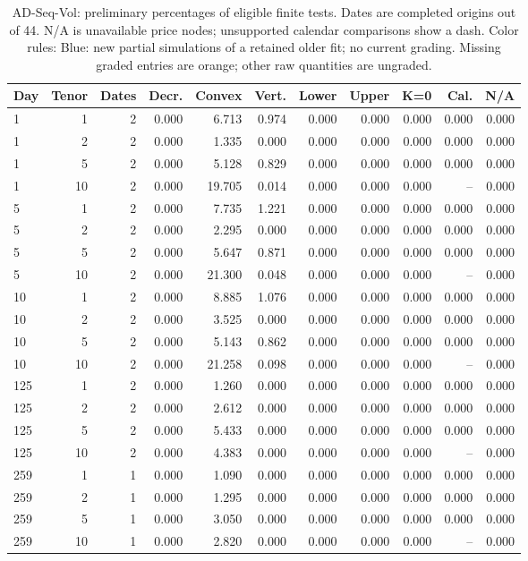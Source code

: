 \documentclass[11pt]{article}
\begin{document}
\begin{table}[H]\centering\small\setlength{\tabcolsep}{4pt}
\caption{AD-Seq-Vol: preliminary percentages of eligible finite tests. Dates are completed origins out of 44. N/A is unavailable price nodes; unsupported calendar comparisons show a dash. Color rules: Blue: new partial simulations of a retained older fit; no current grading. Missing graded entries are orange; other raw quantities are ungraded.}\label{tab:diffusion-static-base}
\begin{tabular}{@{}lrrrrrrrrrr@{}}
\toprule
Day & Tenor & Dates & Decr. & Convex & Vert. & Lower & Upper & K=0 & Cal. & N/A \\
\midrule
1 & 1 & 2 & 0.000 & 6.713 & 0.974 & 0.000 & 0.000 & 0.000 & 0.000 & 0.000 \\
1 & 2 & 2 & 0.000 & 1.335 & 0.000 & 0.000 & 0.000 & 0.000 & 0.000 & 0.000 \\
1 & 5 & 2 & 0.000 & 5.128 & 0.829 & 0.000 & 0.000 & 0.000 & 0.000 & 0.000 \\
1 & 10 & 2 & 0.000 & 19.705 & 0.014 & 0.000 & 0.000 & 0.000 & -- & 0.000 \\
5 & 1 & 2 & 0.000 & 7.735 & 1.221 & 0.000 & 0.000 & 0.000 & 0.000 & 0.000 \\
5 & 2 & 2 & 0.000 & 2.295 & 0.000 & 0.000 & 0.000 & 0.000 & 0.000 & 0.000 \\
5 & 5 & 2 & 0.000 & 5.647 & 0.871 & 0.000 & 0.000 & 0.000 & 0.000 & 0.000 \\
5 & 10 & 2 & 0.000 & 21.300 & 0.048 & 0.000 & 0.000 & 0.000 & -- & 0.000 \\
10 & 1 & 2 & 0.000 & 8.885 & 1.076 & 0.000 & 0.000 & 0.000 & 0.000 & 0.000 \\
10 & 2 & 2 & 0.000 & 3.525 & 0.000 & 0.000 & 0.000 & 0.000 & 0.000 & 0.000 \\
10 & 5 & 2 & 0.000 & 5.143 & 0.862 & 0.000 & 0.000 & 0.000 & 0.000 & 0.000 \\
10 & 10 & 2 & 0.000 & 21.258 & 0.098 & 0.000 & 0.000 & 0.000 & -- & 0.000 \\
125 & 1 & 2 & 0.000 & 1.260 & 0.000 & 0.000 & 0.000 & 0.000 & 0.000 & 0.000 \\
125 & 2 & 2 & 0.000 & 2.612 & 0.000 & 0.000 & 0.000 & 0.000 & 0.000 & 0.000 \\
125 & 5 & 2 & 0.000 & 5.433 & 0.000 & 0.000 & 0.000 & 0.000 & 0.000 & 0.000 \\
125 & 10 & 2 & 0.000 & 4.383 & 0.000 & 0.000 & 0.000 & 0.000 & -- & 0.000 \\
259 & 1 & 1 & 0.000 & 1.090 & 0.000 & 0.000 & 0.000 & 0.000 & 0.000 & 0.000 \\
259 & 2 & 1 & 0.000 & 1.295 & 0.000 & 0.000 & 0.000 & 0.000 & 0.000 & 0.000 \\
259 & 5 & 1 & 0.000 & 3.050 & 0.000 & 0.000 & 0.000 & 0.000 & 0.000 & 0.000 \\
259 & 10 & 1 & 0.000 & 2.820 & 0.000 & 0.000 & 0.000 & 0.000 & -- & 0.000 \\
\bottomrule\end{tabular}\end{table}
\end{document}
